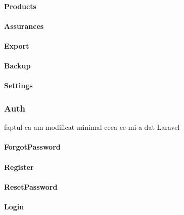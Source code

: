 			\paragraph{Products}
			\paragraph{Assurances}
			\paragraph{Export}
			\paragraph{Backup}
			\paragraph{Settings}
		\subsubsection{Auth}
			faptul ca am modificat minimal ceea ce mi-a dat Laravel
			\paragraph{ForgotPassword}
			\paragraph{Register}
			\paragraph{ResetPassword}
			\paragraph{Login}